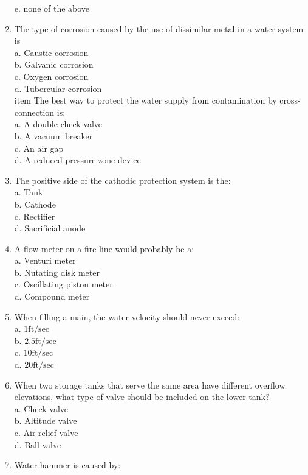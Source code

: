 \begin{enumerate}[1.]
e. none of the above\\
\item The type of corrosion caused by the use of dissimilar metal in a water system is\\
a. Caustic corrosion\\
b. Galvanic corrosion\\
c. Oxygen corrosion\\
d. Tubercular corrosion\\
item The best way to protect the water supply from contamination by cross-connection is:\\
a. A double check valve\\
b. A vacuum breaker\\
c. An air gap\\
d. A reduced pressure zone device\\
\item The positive side of the cathodic protection system is the:\\
a. Tank\\
b. Cathode\\
c. Rectifier\\
d. Sacrificial anode\\
\item A flow meter on a fire line would probably be a:\\
a. Venturi meter\\
b. Nutating disk meter\\
c. Oscillating piston meter\\
d. Compound meter\\
\item When filling a main, the water velocity should never exceed:\\
a. $1 \mathrm{ft} / \mathrm{sec}$\\
b. $2.5 \mathrm{ft} / \mathrm{sec}$\\
c. $10 \mathrm{ft} / \mathrm{sec}$\\
d. $20 \mathrm{ft} / \mathrm{sec}$\\
\item When two storage tanks that serve the same area have different overflow elevations, what type of valve should be included on the lower tank?\\
a. Check valve\\
b. Altitude valve\\
c. Air relief valve\\
d. Ball valve\\
\item Water hammer is caused by:\\

\end{enumerate}
